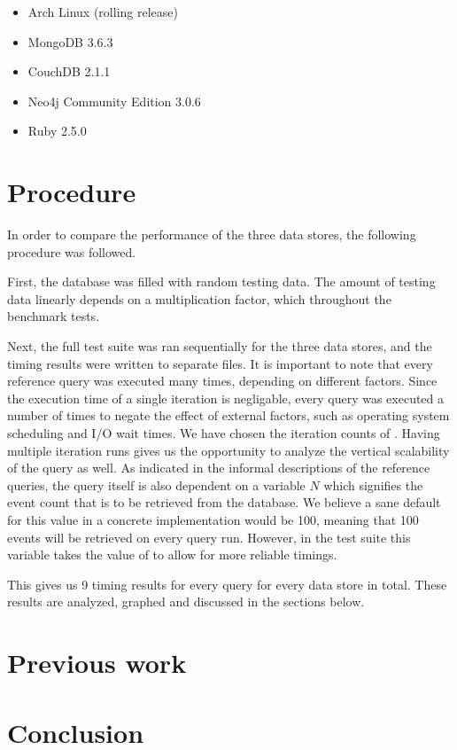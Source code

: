 \begin{itemize}
  \item Arch Linux (rolling release)
  \item MongoDB 3.6.3
  \item CouchDB 2.1.1
  \item Neo4j Community Edition 3.0.6
  \item Ruby 2.5.0
\end{itemize}

\section{Procedure}
\label{sec:procedure}

In order to compare the performance of the three data stores, the following procedure was followed.

First, the database was filled with random testing data.
The amount of testing data linearly depends on a multiplication factor, which  throughout the benchmark tests.

Next, the full test suite was ran sequentially for the three data stores, and the timing results were written to separate files.
It is important to note that every reference query was executed many times, depending on different factors.
Since the execution time of a single iteration is negligable, every query was executed a number of times to negate the effect of external factors, such as operating system scheduling and I/O wait times.
We have chosen the iteration counts of .
Having multiple iteration runs gives us the opportunity to analyze the vertical scalability of the query as well.
As indicated in the informal descriptions of the reference queries, the query itself is also dependent on a variable $N$ which signifies the event count that is to be retrieved from the database.
We believe a sane default for this value in a concrete implementation would be 100, meaning that 100 events will be retrieved on every query run.
However, in the test suite this variable takes the value of  to allow for more reliable timings.

This gives us 9 timing results for every query for every data store in total.
These results are analyzed, graphed and discussed in the sections below.

\section{Previous work}
\label{sec:previous-work}


\section{Conclusion}
\label{sec:comparative-study-conclusion}
